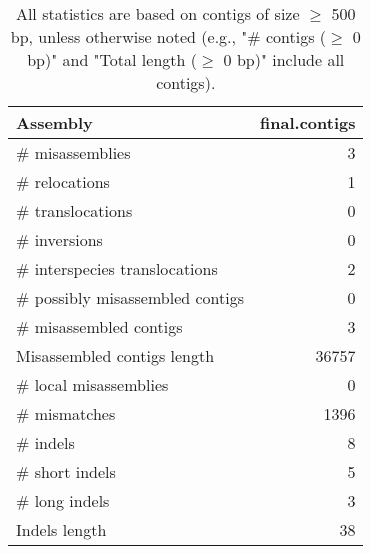 \documentclass[12pt,a4paper]{article}
\begin{document}
\begin{table}[ht]
\begin{center}
\caption{All statistics are based on contigs of size $\geq$ 500 bp, unless otherwise noted (e.g., "\# contigs ($\geq$ 0 bp)" and "Total length ($\geq$ 0 bp)" include all contigs).}
\begin{tabular}{|l*{1}{|r}|}
\hline
Assembly & final.contigs \\ \hline
\# misassemblies & 3 \\ \hline
\hspace{5mm}\# relocations & 1 \\ \hline
\hspace{5mm}\# translocations & 0 \\ \hline
\hspace{5mm}\# inversions & 0 \\ \hline
\hspace{5mm}\# interspecies translocations & 2 \\ \hline
\# possibly misassembled contigs & 0 \\ \hline
\# misassembled contigs & 3 \\ \hline
Misassembled contigs length & 36757 \\ \hline
\# local misassemblies & 0 \\ \hline
\# mismatches & 1396 \\ \hline
\# indels & 8 \\ \hline
\hspace{5mm}\# short indels & 5 \\ \hline
\hspace{5mm}\# long indels & 3 \\ \hline
Indels length & 38 \\ \hline
\end{tabular}
\end{center}
\end{table}
\end{document}
